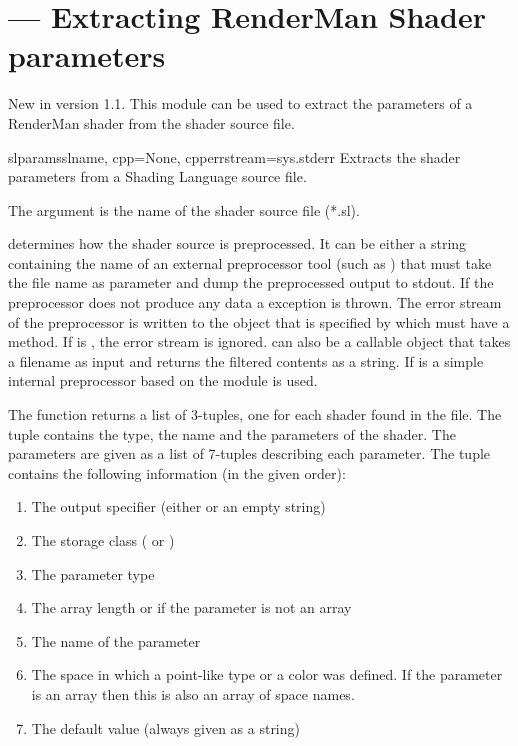\section{ ---
          Extracting RenderMan Shader parameters}
\label{slparams}


New in version 1.1. This module can be used to extract the parameters
of a RenderMan shader from the shader source file.

\begin{funcdesc}{slparams}{slname, cpp=None, cpperrstream=sys.stderr}
Extracts the shader parameters from a Shading Language source file. 

The argument  is the name of the shader source file
(*.sl). 

 determines how the shader source is preprocessed. It can be
either a string containing the name of an external preprocessor tool
(such as ) that must take the file name as parameter and
dump the preprocessed output to stdout. If the preprocessor does not
produce any data a  exception is
thrown. The error stream of the preprocessor is written to the object
that is specified by  which must have a
 method. If  is , the error 
stream is ignored.  can also be a callable object that takes a
filename as input and returns the filtered contents as a string. If
 is  a simple internal preprocessor based on the 
 module is used.

The function returns a list of 3-tuples, one for each shader found in
the file. The tuple contains the type, the name and the parameters of
the shader. The parameters are given as a list of 7-tuples describing
each parameter. The tuple contains the following information (in the
given order):

\begin{enumerate}
\item The output specifier (either  or an empty string) 
\item The storage class ( or ) 
\item The parameter type 
\item The array length or  if the parameter is not an array 
\item The name of the parameter 
\item The space in which a point-like type or a color was defined. If the parameter is an array then this is also an array of space names. 
\item The default value (always given as a string)
\end{enumerate}


\end{funcdesc}
